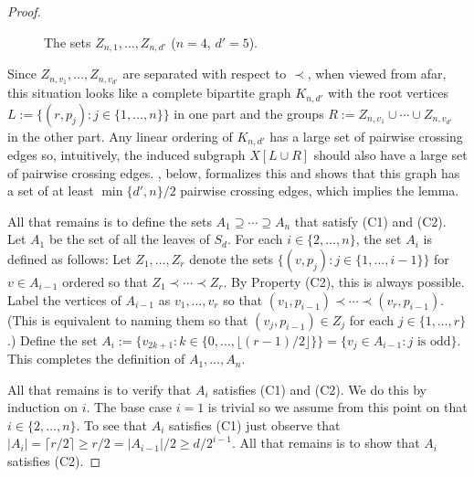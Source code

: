 \documentclass[kpfonts]{patmorin}
\renewcommand{\ge}{\geqslant}
\begin{document}
\begin{proof}
\begin{figure}
\begin{center}
		\end{center}
		\caption{The sets $Z_{n,1},\ldots,Z_{n,d'}$ ($n=4$, $d'=5$).}
	\end{figure}

    Since $Z_{n,v_1},\ldots,Z_{n,v_{d'}}$ are separated with respect to $\prec$, when viewed from afar, this situation looks like a complete bipartite graph $K_{n,d'}$ with the root vertices $L:=\{(r,p_j):j\in\{1,\ldots,n\}\}$ in one part and the groups $R:=Z_{n,v_1}\cup\cdots\cup Z_{n,v_{d'}}$ in the other part.  Any linear ordering of $K_{n,d'}$ has a large set of pairwise crossing edges so, intuitively, the induced subgraph $X[L\cup R]$ should also have a large set of pairwise crossing edges. , below, formalizes this and shows that this graph has a set of at least $\min\{d',n\}/2$ pairwise crossing edges, which implies the lemma. 

    All that remains is to define the sets $A_1\supseteq\cdots\supseteq A_n$ that satisfy (C1) and (C2).  Let $A_1$ be the set of all the leaves of $S_d$.  For each $i\in\{2,\ldots,n\}$, the set $A_i$ is defined as follows:  Let $Z_1,\ldots,Z_r$ denote the sets $\{(v,p_j):j\in\{1,\ldots,i-1\}\}$ 
     for $v\in A_{i-1}$ ordered so that $Z_1\prec\cdots\prec Z_r$.  By Property (C2), this is always possible.	Label the vertices of $A_{i-1}$ as $v_1,\ldots,v_r$ so that $(v_1,p_{i-1})\prec\cdots\prec (v_r,p_{i-1})$.   (This is equivalent to naming them so that $(v_j,p_{i-1})\in Z_j$ for each $j\in\{1,\ldots,r\}$.)  Define the set $A_i:=\{v_{2k+1}:k\in\{0,\ldots,\lfloor(r-1)/2\rfloor\}\}=\{v_{j}\in A_{i-1}:\text{$j$ is odd}\}$.  This completes the definition of $A_1,\ldots,A_n$.

	All that remains is to verify that $A_i$ satisfies (C1) and (C2).  We do this by induction on $i$. The base case $i=1$ is trivial so we assume from this point on that $i\in\{2,\ldots,n\}$.   To see that $A_i$ satisfies (C1) just observe that $|A_i|=\lceil r/2\rceil \ge r/2= |A_{i-1}|/2\ge d/2^{i-1}$.  All that remains is to show that $A_i$ satisfies (C2).


\end{proof}
\end{document}
